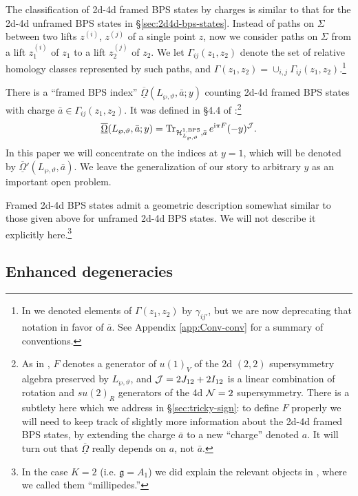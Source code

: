 \documentclass[11pt,a4paper]{article}
\def\fg{\mathfrak{g}}
\def\CJ {{\cal J}}
\def\CH {{\cal H}}
\def\fg{\mathfrak{g}}
\def\CJ {{\cal J}}
\def\CH {{\cal H}}
\newcommand\I{{\mathrm i}}
\newcommand\N{{\cal N}}
\newcommand\fro{{\overline{\underline{\Omega}}}}
\begin{document}
The classification of 2d-4d framed BPS states by charges is similar to that
for the 2d-4d unframed BPS states in \S\ref{sec:2d4d-bps-states}.
Instead of
paths on $\Sigma$ between two lifts $z^{(i)}$, $z^{(j)}$ of a single point $z$, now we consider
paths on $\Sigma$ from a lift $z^{(i)}_1$ of $z_1$ to a lift $z^{(j)}_2$ of $z_2$.
We let $\Gamma_{ij}(z_1, z_2)$ denote the set of relative homology classes represented by such paths,
and $\Gamma(z_1, z_2) = \cup_{i,j} \Gamma_{ij}(z_1,z_2)$.\footnote{In \cite{Gaiotto:2011tf} we denoted
elements of $\Gamma(z_1,z_2)$ by $\gamma_{ij'}$, but we are now deprecating that
notation in favor of $\bar a$. See Appendix \ref{app:Conv-conv} for a summary of conventions.}

There is a ``framed BPS index'' $\fro(L_{\wp,\vartheta}, \bar a;y)$
counting 2d-4d framed BPS states with charge $\bar a \in \Gamma_{ij}(z_1, z_2)$.
It was defined in
\S 4.4 of \cite{Gaiotto:2011tf}:\footnote{As in \cite{Gaiotto:2011tf}, $F$ denotes a generator of $u(1)_V$ of the 2d $(2,2)$ supersymmetry algebra
preserved by $L_{\wp,\vartheta}$, and $\CJ = 2 J_{12} + 2 I_{12}$
is a linear combination of rotation and $su(2)_R$ generators of the 4d $\N=2$
supersymmetry.  There is a subtlety here
which we address in \S\ref{sec:tricky-sign}:
to define $F$ properly we will need to keep track of slightly more information about the 2d-4d framed
BPS states, by extending the charge $\bar{a}$
to a new ``charge'' denoted $a$.  It will turn out that $\fro$ really depends on $a$, not $\bar a$.}
\begin{equation}\label{eq:2d-4d-motindx}
\fro(L_{\wp,\vartheta}, \bar a;y) = {\rm Tr}_{\CH^{1,\rm BPS}_{L_{\wp,\vartheta}},\bar a} \, e^{\I \pi F} (-y)^{\CJ}.
\end{equation}
In this paper we will concentrate on the indices at $y=1$, which will be denoted
by $\fro'(L_{\wp,\vartheta}, \bar a)$.  We leave the generalization of our story to arbitrary $y$
as an important open problem.

Framed 2d-4d BPS states admit a geometric description somewhat similar to those given above
for unframed 2d-4d BPS states.  We will not describe it
explicitly here.\footnote{In the case $K=2$ (i.e. $\fg = A_1$) we did explain the relevant objects
in \cite{Gaiotto:2010be}, where we called them ``millipedes.''}


\subsection{Enhanced degeneracies} \label{sec:enh-4d}
\end{document}
